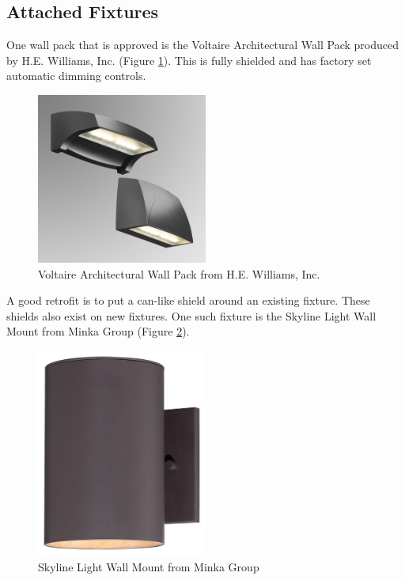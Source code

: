 \documentclass[12pt, oneside]{article}
\begin{document}
\subsection{Attached Fixtures}
One wall pack that is approved is the Voltaire Architectural Wall Pack produced by H.E. Williams, Inc. (Figure \ref{Voltaire}). This is fully shielded and has factory set automatic dimming controls.
\begin{figure}[p]
	\centering
	\includegraphics[width=0.5\textwidth]{Wallpack.jpg}
	\caption[Voltaire Architectural Wall Pack]{Voltaire Architectural Wall Pack from H.E. Williams, Inc.}
	\label{Voltaire}
\end{figure}
A good retrofit is to put a can-like shield around an existing fixture. These shields also exist on new fixtures. One such fixture is the Skyline Light Wall Mount from Minka Group (Figure \ref{lightinacan}).
\begin{figure}[p]
	\centering
	\includegraphics[width=0.5\textwidth]{lightinacan.jpg}
	\caption[Skyline Light Wall Mount]{Skyline Light Wall Mount from Minka Group}
	\label{lightinacan}
\end{figure}
\end{document}
